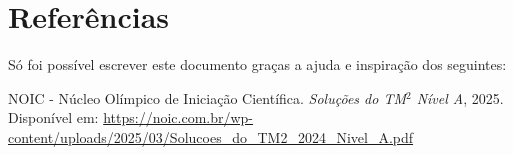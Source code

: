 \documentclass[12pt]{article}
\begin{document}
  \clearpage
  
  \section{\textsf{Referências}}
  Só foi possível escrever este documento graças a ajuda e inspiração dos seguintes:

  \renewcommand{\refname}{\vspace{-2em}}
  \begin{thebibliography}{9}
    NOIC - Núcleo Olímpico de Iniciação Científica.
    \textit{Soluções do TM$^2$ Nível A}, 2025.
    Disponível em: \url{https://noic.com.br/wp-content/uploads/2025/03/Solucoes_do_TM2_2024_Nivel_A.pdf}
  \end{thebibliography}
\end{document}
